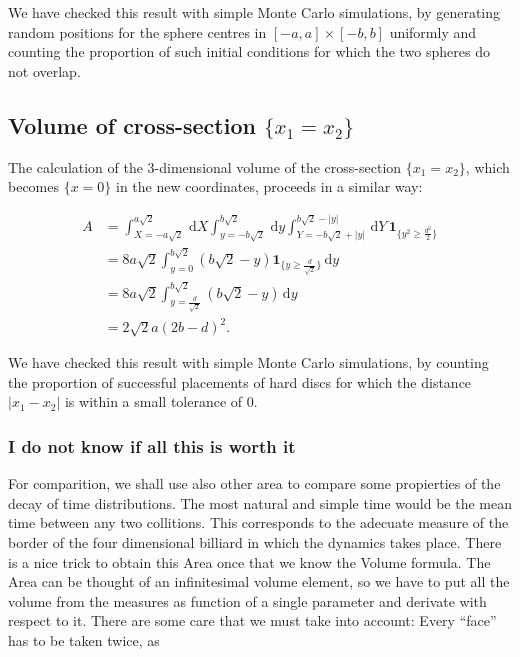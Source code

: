 \documentclass[a4paper,10pt]{article}
\newcommand{\rd}{\, \mathrm{d}}
\newcommand{\indicator}[1]{\mathbf{1}_{ \{   #1 \} } }
\begin{document}
We have checked this result with simple Monte Carlo simulations, by generating random positions for the sphere centres in $[-a,a] \times [-b,b]$ uniformly and 
counting the proportion of such initial conditions for which the two spheres do not overlap.



\subsection{Volume of cross-section $\{x_1 = x_2\}$}
The calculation of the $3$-dimensional volume of the cross-section $\{x_1 = x_2\}$, which becomes 
$\{ x=0 \}$ in the new coordinates, proceeds in a similar way:

\begin{align}
 A &= \int_{X=-a \sqrt{2} }^{a \sqrt{2}}  \rd X
 \int_{y=-b \sqrt{2}}^{b \sqrt{2}} \rd y
\int_{Y=-b \sqrt{2} + |y| }^{b \sqrt{2}-|y|}  \rd Y
\, \indicator{y^2 \ge \frac{d^2}{2} } \\
&= 8 a \sqrt{2} \int_{y=0}^{b \sqrt{2}} \left( b \sqrt{2} - y \right)  \indicator{y \ge \frac{d}{\sqrt{2}}}  \rd y \\
&= 8 a \sqrt{2} \int_{y= \frac{d}{\sqrt{2}}}^{b \sqrt{2}}  \left( b \sqrt{2} - y \right)  \rd y \\
&= 2 \sqrt{2} a ( 2b - d )^2.
\end{align}

We have checked this result with simple Monte Carlo simulations, by counting the proportion of successful placements of hard discs for which the distance $|x_1 - x_2|$ is within a small tolerance of $0$.


\subsubsection{I do not know if all this is worth it\ldot}
For comparition, we shall use also other area to compare
some propierties of the decay of time distributions. The most natural and simple
time would be the mean time between any two collitions. This corresponds
to the adecuate measure of the border of the four dimensional
billiard in which the dynamics takes place. There is a nice trick
to obtain this Area once that we know the Volume formula. The Area
can be thought of an infinitesimal volume element, so we have to put
all the volume from the measures as function of a single parameter
and derivate with respect to it. 
There are some care that we must take into account:
Every ``face'' has to be taken twice, as  
\end{document}

